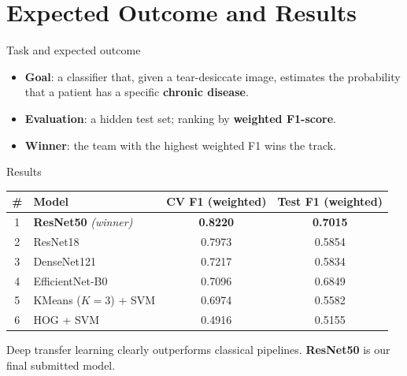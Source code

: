 \documentclass[aspectratio=169]{beamer}
\begin{document}
\section{Expected Outcome and Results}

\begin{frame}{Task and expected outcome}
    \begin{itemize}
        \item \textbf{Goal}: a classifier that, given a tear-desiccate image,
              estimates the probability that a patient has a specific
              \textbf{chronic disease}.
        \item \textbf{Evaluation}: a hidden test set; ranking by
              \textbf{weighted F1-score}.
        \item \textbf{Winner}: the team with the highest weighted F1 wins the track.
    \end{itemize}
\end{frame}

\begin{frame}{Results}
    \centering
    \begin{tabular}{clcc}
        \toprule
        \textbf{\#} & \textbf{Model} & \textbf{CV F1 (weighted)} & \textbf{Test F1 (weighted)} \\
        \midrule
        1 & \textbf{ResNet50} \textit{(winner)} & \textbf{0.8220} & \textbf{0.7015} \\
        2 & ResNet18                             & 0.7973 & 0.5854 \\
        3 & DenseNet121                          & 0.7217 & 0.5834 \\
        4 & EfficientNet-B0                      & 0.7096 & 0.6849 \\
        5 & KMeans ($K{=}3$) + SVM               & 0.6974 & 0.5582 \\
        6 & HOG + SVM                            & 0.4916 & 0.5155 \\
        \bottomrule
    \end{tabular}

    \vspace{1em}
    \small
    Deep transfer learning clearly outperforms classical pipelines.
    \textbf{ResNet50} is our final submitted model.
\end{frame}
\end{document}
